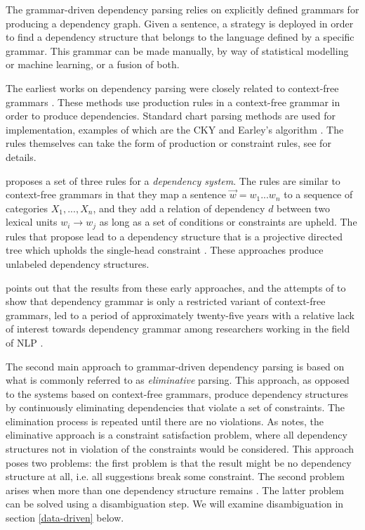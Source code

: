 The grammar-driven dependency parsing relies on explicitly defined grammars for producing a dependency graph. Given a sentence, a strategy is deployed in order to find a dependency structure that belongs to the language defined by a specific grammar. This grammar can be made manually, by way of statistical modelling or machine learning, or a fusion of both.


The earliest works on dependency parsing were closely related to context-free grammars \cite{KublerEtAl:09}. These methods use production rules in a context-free grammar in order to produce dependencies. Standard chart parsing methods are used for implementation, examples of which are the CKY \cite{Younger:67} and Earley's algorithm \cite{Early:70}. The rules themselves can take the form of production or constraint rules, see  for details.

\citeauthor{Gaifman:65} proposes a set of three rules for a \textit{dependency system}. The rules are similar to context-free grammars in that they map a sentence $\vec{w} = w_1 ... w_n$ to a sequence of categories $X_1, ..., X_n$, and they add a relation of dependency $d$ between two lexical units $w_i \rightarrow w_j$ as long as a set of conditions or constraints are upheld. The rules that \citeauthor{Gaifman:65} propose lead to a dependency structure that is a projective directed tree which upholds the single-head constraint \cite{Gaifman:65}. These approaches produce unlabeled dependency structures.

\citeauthor{Niv:05} points out that the results from these early approaches, and the attempts of \citeauthor{Gaifman:65} to show that dependency grammar is only a restricted variant of context-free grammars, led to a period of approximately twenty-five years with a relative lack of interest towards dependency grammar among researchers working in the field of NLP \cite{Niv:05}.

The second main approach to grammar-driven dependency parsing is based on what is commonly referred to as \textit{eliminative} parsing. This approach, as opposed to the systems based on context-free grammars, produce dependency structures by continuously eliminating dependencies that violate a set of constraints. The elimination process is repeated until there are no violations. As \citeauthor{Niv:05} notes, the eliminative approach is a constraint satisfaction problem, where all dependency structures not in violation of the constraints would be considered. This approach poses two problems: the first problem is that the result might be no dependency structure at all, i.e. all suggestions break some constraint. The second problem arises when more than one dependency structure remains \cite{Niv:05}. The latter problem can be solved using a disambiguation step. We will examine disambiguation in section \ref{data-driven} below.

